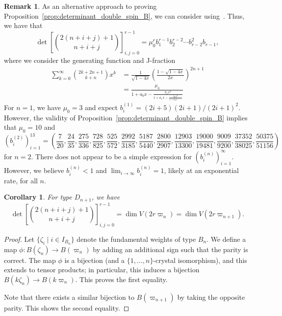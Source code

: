 \documentclass[11pt, leqno]{amsart}
\theoremstyle{plain}
\newtheorem{corollary}[theorem]{Corollary}
\theoremstyle{definition}
\newtheorem{remark}[theorem]{Remark}
\numberwithin{equation}{section}
\newcommand{\fw}{\varpi} %
\begin{document}
\begin{remark}
As an alternative approach to proving Proposition~\ref{prop:determinant_double_spin_B}, we can consider using~\cite[Thm.~11]{Krat99}.
Thus, we have that
\[
\det \left[ \binom{2(n+i+j)+1}{n+i+j} \right]_{i,j=0}^{r-1} = \mu_0^r b_1^{r-1} b_2^{r-2} \dotsm b_{r-2}^2 b_{r-1},
\]
where we consider the generating function and J-fraction
\begin{align*}
\sum_{k=0}^{\infty} \binom{2k+2n+1}{k+n} x^k & = \frac{1}{\sqrt{1-4x}} \left( \frac{1 - \sqrt{1-4x}}{2x} \right)^{2n+1}
\\ & =  \frac{\mu_0}{\displaystyle 1 + a_0 x - \frac{b_1 x^2}{\displaystyle 1 + a_1 x -\frac{b_2 x^2}{\displaystyle 1 + a_2 x - \cdots}}}
\end{align*}
For $n = 1$, we have $\mu_0 = 3$ and expect $b^{(1)}_i = (2i+5)(2i+1) / (2i+1)^2$.
However, the validity of Proposition~\ref{prop:determinant_double_spin_B} implies that $\mu_0 = 10$ and
\[
\left( b^{(2)}_i \right)_{i=1}^{13} = \left( \frac{7}{20}, \frac{24}{35}, \frac{275}{336}, \frac{728}{825}, \frac{525}{572}, \frac{2992}{3185}, \frac{5187}{5440}, \frac{2800}{2907}, \frac{12903}{13300}, \frac{19000}{19481}, \frac{9009}{9200}, \frac{37352}{38025}, \frac{50375}{51156} \right)
\]
for $n = 2$. There does not appear to be a simple expression for $\left( b^{(n)}_i \right)_{i=1}^{\infty}$. However, we believe $b_i^{(n)} < 1$ and $\lim_{i \to \infty} b_i^{(n)} = 1$, likely at an exponential rate, for all $n$.
\end{remark}

\begin{corollary}
For type $D_{n+1}$, we have
\[
\det \left[\binom{2(n+i+j)+1}{n+i+j}\right]_{i,j=0}^{r-1} = \dim V(2r \fw_n) = \dim V(2r \fw_{n+1}).
\]
\end{corollary}

\begin{proof}
Let $\{\zeta_i \mid i \in I_{B_n} \}$ denote the fundamental weights of type $B_n$.
We define a map $\phi \colon B(\zeta_n) \to B(\fw_n)$ by adding an additional sign such that the parity is correct. The map $\phi$ is a bijection (and a $\{1, \dotsc, n\}$-crystal isomorphism), and this extends to tensor products; in particular, this induces a bijection $B(k\zeta_n) \to B(k\fw_n)$. This proves the first equality.

Note that there exists a similar bijection to $B(\fw_{n+1})$ by taking the opposite parity. This shows the second equality.
\end{proof}
\end{document}
